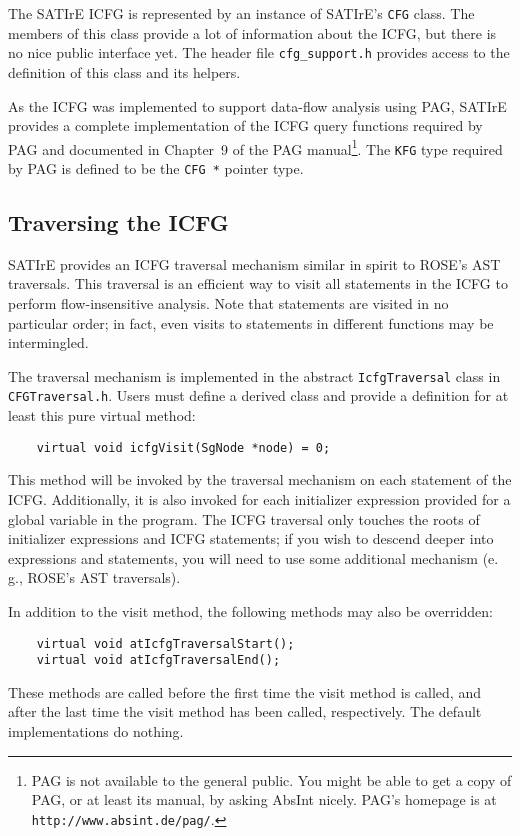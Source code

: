 \documentclass[a4paper,12pt]{report}
\begin{document}
The SATIrE ICFG is represented by an instance of SATIrE's \texttt{CFG}
class. The members of this class provide a lot of information about the
ICFG, but there is no nice public interface yet. The header file
\verb|cfg_support.h| provides access to the definition of this class and its
helpers.

As the ICFG was implemented to support data-flow analysis using PAG, SATIrE
provides a complete implementation of the ICFG query functions required by
PAG and documented in Chapter~9 of the PAG manual\footnote{PAG is not
available to the general public. You might be able to get a copy of PAG,
or at least its manual, by asking AbsInt nicely. PAG's homepage is at
\texttt{http://www.absint.de/pag/}.}. The \texttt{KFG} type
required by PAG is defined to be the \verb|CFG *| pointer type.

\subsection{Traversing the ICFG}
\label{sec:icfg_traversal}

SATIrE provides an ICFG traversal mechanism similar in spirit to ROSE's AST
traversals. This traversal is an efficient way to visit all statements in
the ICFG to perform flow-insensitive analysis. Note that statements are
visited in no particular order; in fact, even visits to statements in
different functions may be intermingled.

The traversal mechanism is implemented in the abstract
\texttt{IcfgTraversal} class in \verb|CFGTraversal.h|. Users must define a
derived class and provide a definition for at least this pure virtual
method:
\begin{verbatim}
    virtual void icfgVisit(SgNode *node) = 0;
\end{verbatim}
This method will be invoked by the traversal mechanism on each statement of
the ICFG. Additionally, it is also invoked for each initializer expression
provided for a global variable in the program. The ICFG traversal only
touches the roots of initializer expressions and ICFG statements; if you
wish to descend deeper into expressions and statements, you will need to use
some additional mechanism (e.\,g., ROSE's AST traversals).

In addition to the visit method, the following methods may also be
overridden:
\begin{verbatim}
    virtual void atIcfgTraversalStart();
    virtual void atIcfgTraversalEnd();
\end{verbatim}
These methods are called before the first time the visit method is called,
and after the last time the visit method has been called, respectively. The
default implementations do nothing.
\end{document}
